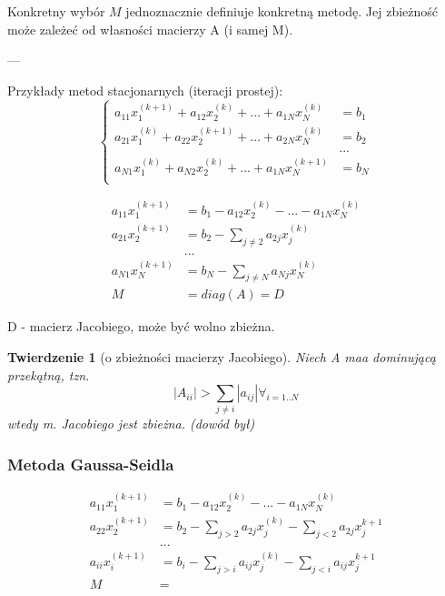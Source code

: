 \documentclass[hidelinks,a4paper]{article}
\newtheorem{twierdz}{Twierdzenie}
\begin{document}
Konkretny wybór $M$ jednoznacznie definiuje konkretną metodę. Jej zbieżność może zależeć od własności macierzy A (i samej M).

---

Przykłady metod stacjonarnych (iteracji prostej):
\[
	\left\{ \begin{array}{ll}
	a_{11}x_1^{(k+1)} + a_{12}x_2^{(k)} + ... + a_{1N}x_N^{(k)} & = b_1 \\
	a_{21}x_1^{(k)} + a_{22}x_2^{(k+1)} + ... + a_{2N}x_N^{(k)} & = b_2 \\
	& ... \\
	a_{N1}x_1^{(k)} + a_{N2}x_2^{(k)} + ... + a_{1N}x_N^{(k+1)} & = b_N \\
	\end{array} \right.
\]

\[
	\begin{array}{ll}
		a_{11}x_1^{(k+1)} & = b_1 - a_{12}x_2^{(k)} - ... - a_{1N}x_N^{(k)} \\
		a_{21}x_2^{(k+1)} & = b_2 - \sum_{j\neq 2} a_{2j}x_j^{(k)}          \\
		                  & ...                                             \\
		a_{N1}x_N^{(k+1)} & = b_N - \sum_{j\neq N} a_{Nj}x_N^{(k)}          \\
		M                 & = diag(A) = D                                   
	\end{array}
\]

D - macierz Jacobiego, może być wolno zbieżna.

\begin{twierdz}[o zbieżności macierzy Jacobiego] Niech A maa dominującą przekątną, tzn.
	\[
		|A_{ii}| > \sum_{j \neq i}|a_{ij}| \forall_{i=1..N}
	\]
	wtedy m. Jacobiego jest zbieżna. (dowód był)	
\end{twierdz}
 

\subsubsection{Metoda Gaussa-Seidla} 
\[
	\begin{array}{ll}
		a_{11}x_1^{(k+1)} & = b_1 - a_{12}x_2^{(k)} - ... - a_{1N}x_N^{(k)}                     \\
		a_{22}x_2^{(k+1)} & = b_2 - \sum_{j > 2} a_{2j}x_j^{(k)} - \sum_{j < 2} a_{2j}x_j^{k+1} \\
		                  & ...                                                                 \\
		a_{ii}x_i^{(k+1)} & = b_i - \sum_{j > i} a_{ij}x_j^{(k)} - \sum_{j < i} a_{ij}x_j^{k+1} \\
		M                 & =                                                                   
	\end{array}
\]
 
\end{document}
